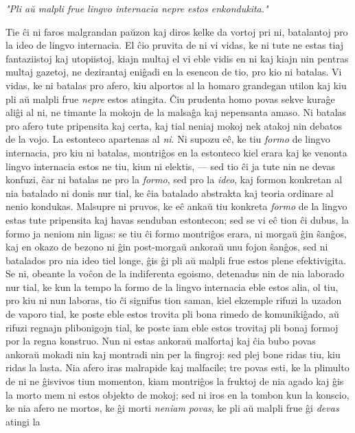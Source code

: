 \emph{"Pli a\u u malpli frue lingvo internacia nepre estos enkondukita."}

   Tie \^ci ni faros malgrandan pa\u uzon kaj diros kelke da vortoj pri
ni, batalantoj pro la ideo de lingvo internacia. El \^cio pruvita de
ni vi vidas, ke ni tute ne estas tiaj fantaziistoj kaj utopiistoj,
kiajn multaj el vi eble vidis en ni kaj kiajn nin pentras multaj
gazetoj, ne dezirantaj eni\^gadi en la esencon de tio, pro kio ni
batalas. Vi vidas, ke ni batalas pro afero, kiu alportos al la
homaro grandegan utilon kaj kiu pli a\u u malpli frue {\sl nepre}
estos atingita. \^Ciu prudenta homo povas sekve kura\^ge ali\^gi al
ni, ne timante la mokojn de la malsa\^ga kaj nepensanta amaso. Ni
batalas pro afero tute pripensita kaj certa, kaj tial neniaj mokoj
nek atakoj nin debatos de la vojo. La estonteco apartenas al {\sl
ni}. Ni supozu e\^c, ke tiu {\sl formo} de lingvo internacia, pro
kiu ni batalas, montri\^gos en la estonteco kiel erara kaj ke
venonta lingvo internacia estos ne tiu, kiun ni elektis, --- sed tio
\^ci ja tute nin ne devas konfuzi, \^car ni batalas ne pro la {\sl
formo}, sed pro la {\sl ideo}, kaj formon konkretan al nia batalado
ni donis nur tial, ke \^cia batalado abstrakta kaj teoria ordinare
al nenio kondukas. Malsupre ni pruvos, ke e\^c anka\u u tiu konkreta
{\sl formo} de la lingvo estas tute pripensita kaj havas senduban
estontecon; sed se vi e\^c tion \^ci dubus, la formo ja neniom nin
ligas: se tiu \^ci formo montri\^gos erara, ni morga\u u \^gin
\^san\^gos, kaj en okazo de bezono ni \^gin post-morga\u u ankora\u
u unu fojon \^san\^gos, sed ni batalados pro nia ideo tiel longe,
\^gis \^gi pli a\u u malpli frue estos plene efektivigita. Se ni,
obeante la vo\^con de la indiferenta egoismo, detenadus nin de nia
laborado nur tial, ke kun la tempo la formo de la lingvo internacia
eble estos alia, ol tiu, pro kiu ni nun laboras, tio \^ci signifus
tion saman, kiel ekzemple rifuzi la uzadon de vaporo tial, ke poste
eble estos trovita pli bona rimedo de komuniki\^gado, a\u u rifuzi
regnajn plibonigojn tial, ke poste iam eble estos trovitaj pli bonaj
formoj por la regna konstruo. Nun ni estas ankora\u u malfortaj kaj
\^cia bubo povas ankora\u u mokadi nin kaj montradi nin per la
fingroj: sed plej bone ridas tiu, kiu ridas la lasta. Nia afero iras
malrapide kaj malfacile; tre povas esti, ke la plimulto de ni ne
\^gisvivos tiun momenton, kiam montri\^gos la fruktoj de nia agado
kaj \^gis la morto mem ni estos objekto de mokoj; sed ni iros en la
tombon kun la konscio, ke nia afero ne mortos, ke \^gi morti {\sl
neniam povas}, ke pli a\u u malpli frue \^gi {\sl devas} atingi la
